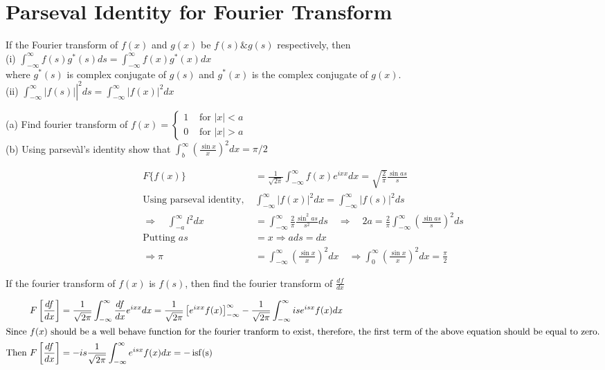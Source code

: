 \section{Parseval Identity for Fourier Transform}
If the Fourier transform of $f(x)$ and $g(x)$ be $f(s) \& g(s)$ respectively, then\\
(i) $\int_{-\infty}^{\infty} f(s) g^{*}(s) d s=\int_{-\infty}^{\infty} f(x) g^{*}(x) d x$\\
where $g^{*}(s)$ is complex conjugate of $g(s)$ and $g^{*}(x)$ is the complex conjugate of $g(x)$.\\
(ii) $\left.\int_{-\infty}^{\infty}|f(s)|\right|^{2} d s=\int_{-\infty}^{\infty}|f(x)|^{2} d x$
\begin{exercise}
	(a) Find fourier transform of $f(x)= \begin{cases}1 & \text { for }|x|<a \\ 0 & \text { for }|x|>a\end{cases}$\\
	(b) Using parsevàl's identity show that $\int_{b}^{\infty}\left(\frac{\sin x}{x}\right)^{2} d x=\pi / 2$
\end{exercise}
\begin{answer}
	\begin{align*}
	F\{f(x)\}&=\frac{1}{\sqrt{2 \pi}} \int_{-\infty}^{\infty} f(x) e^{i x x} d x=\sqrt{\frac{2}{\pi}} \frac{\sin a s}{s}\\
	\text{Using parseval identity, }&\int_{-\infty}^{\infty}|f(x)|^{2} d x=\int_{-\infty}^{\infty}|f(s)|^{2} d s\\
	\Rightarrow \quad \int_{-a}^{\infty} l^{2} d x&=\int_{-\infty}^{\infty} \frac{2}{\pi} \frac{\sin ^{2} a s}{s^{2}} d s \quad \Rightarrow \quad 2 a=\frac{2}{\pi} \int_{-\infty}^{\infty}\left(\frac{\sin a s}{s}\right)^{2} d s\\
	\text{Putting }a s&=x \Rightarrow a d s=d x\\
	\Rightarrow \pi&=\int_{-\infty}^{\infty}\left(\frac{\sin x}{x}\right)^{2} d x \quad \Rightarrow \int_{0}^{\infty}\left(\frac{\sin x}{x}\right)^{2} d x=\frac{\pi}{2}
	\end{align*}
\end{answer}
\begin{exercise}
	If the fourier transform of $f(x)$ is $f(s)$, then find the fourier transform of $\frac{d f}{d x}$
\end{exercise}
\begin{answer}
	\begin{align*}
	F\left[\frac{d f}{d x}\right]&=\frac{1}{\sqrt{2 \pi}} \int_{-\infty}^{\infty} \frac{d f}{d x} e^{i x x} d x=\frac{1}{\sqrt{2 \pi}}\left[e^{i x x} f(x)\right]_{-\infty}^{\infty}-\frac{1}{\sqrt{2 \pi}} \int_{-\infty}^{\infty} i s e^{i s x} f(x) d x\\
	\intertext{Since $f(x)$ should be a well behave function for the fourier tranform to exist, therefore, the first term of the above equation should be equal to zero.}
	\text{Then }F\left[\frac{d f}{d x}\right]&=-i s \frac{1}{\sqrt{2 \pi}} \int_{-\infty}^{\infty} e^{i s x} f(x) d x=-\operatorname{isf}(\mathrm{s})
	\end{align*}
\end{answer}
